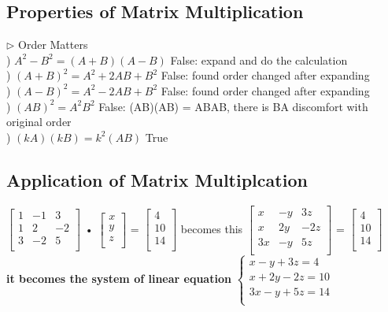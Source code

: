 \documentclass{article}
\begin{document}
\subsection{Properties of Matrix Multiplication}

$\rhd$ Order Matters \\
) $A^2 - B^2 = (A+B)(A-B)$ {\color{red}False: expand and do the calculation}  \\
) $(A+B)^2 = A^2 + 2AB + B^2$ {\color{red}False: found order changed after expanding} \\
) $(A-B)^2 = A^2 - 2AB + B^2$ {\color{red}False: found order changed after expanding}  \\
) $(AB)^2 = A^2B^2$ {\color{red}False: (AB)(AB) = ABAB, there is BA discomfort with original order} \\
) $(kA)(kB) = k^2(AB)$ {\color{green}True}


\subsection{Application of Matrix Multiplcation}

$\begin{bmatrix} 
    1 & -1 & 3 \\ 
    1 & 2 & -2 \\ 
    3 & -2 & 5 \\ 
\end{bmatrix}$
• 
$\begin{bmatrix} 
    x \\
    y \\ 
    z \\
\end{bmatrix}$
= 
$\begin{bmatrix} 
    4 \\
    10 \\ 
    14 \\
\end{bmatrix}$
becomes this
$\begin{bmatrix} 
    x & -y & 3z \\ 
    x & 2y & -2z \\ 
    3x & -y & 5z \\ 
\end{bmatrix}$
=
$\begin{bmatrix} 
    4 \\
    10 \\ 
    14 \\
\end{bmatrix}$
\\
\textbf{it becomes the system of linear equation}
$\begin{cases}
    x-y+3z = 4 \\ 
    x+2y-2z = 10 \\ 
    3x-y+5z = 14 \\ 
\end{cases}$
\end{document}

